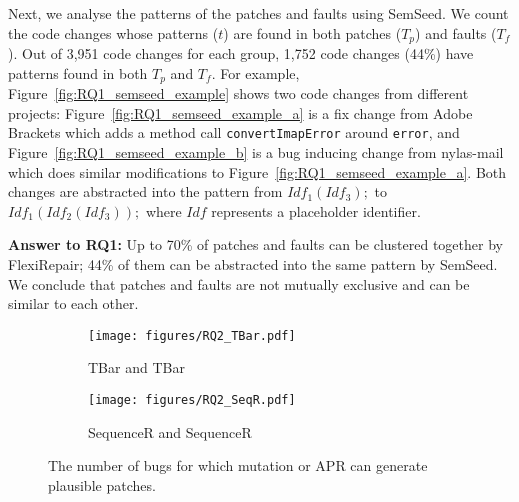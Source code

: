 \documentclass[conference]{IEEEtran}
\newcommand\inv[1]{#1\raisebox{1.15ex}{$\scriptscriptstyle-\!1$}}
\begin{document}
Next, we analyse the patterns of the patches and faults using SemSeed. We count
the code changes whose patterns ($t$) are found in both patches ($T_{p}$) and
faults ($T_{f}$).
Out of 3,951 code changes for each group, 1,752 code changes (44\%) have
patterns found in both $T_{p}$ and $T_{f}$. For example,
Figure~\ref{fig:RQ1_semseed_example} shows two code changes from different
projects: Figure~\ref{fig:RQ1_semseed_example_a} is a fix change from Adobe
Brackets which adds a method call \texttt{convertImapError} around
\texttt{error}, and Figure~\ref{fig:RQ1_semseed_example_b} is a bug inducing
change from nylas-mail which does similar modifications to
Figure~\ref{fig:RQ1_semseed_example_a}. Both changes are abstracted into the
pattern from $Idf_1(Idf_3);$ to $Idf_1 (Idf_2 (Idf_3));$ where $Idf$ represents
a placeholder identifier.

\begin{tcolorbox}[boxrule=0pt,frame hidden,sharp corners,enhanced,borderline north={1pt}{0pt}{black},borderline south={1pt}{0pt}{black},boxsep=2pt,left=2pt,right=2pt,top=2.5pt,bottom=2pt]
\textbf{Answer to RQ1:} Up to 70\% of patches and faults can be clustered 
together by FlexiRepair; 44\% of them can be abstracted into the same pattern 
by SemSeed. We conclude that patches and faults are not mutually exclusive and 
can be similar to each other.
\end{tcolorbox}




\begin{figure}[!ht]
    \begin{subfigure}{0.5\linewidth}
        \centering
        \texttt{[image: figures/RQ2\_TBar.pdf]}
        \caption{TBar and \inv{TBar}}
        \label{fig:RQ2_venn_TBar}
    \end{subfigure}%
    \begin{subfigure}{0.5\linewidth}
        \centering
        \texttt{[image: figures/RQ2\_SeqR.pdf]}
        \caption{SequenceR and \inv{SequenceR}}
        \label{fig:RQ2_venn_SequenceR}
    \end{subfigure}
\caption{The number of bugs for which mutation or APR can generate plausible patches.}
\label{fig:RQ2_venn}
\end{figure}
\end{document}
